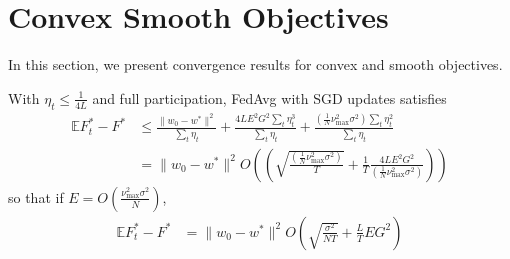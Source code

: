 


\section{Convex Smooth Objectives}

In this section, we present convergence results for convex and smooth objectives. 

\begin{theorem}
	With $\eta_{t}\leq\frac{1}{4L}$ and full participation, FedAvg with SGD updates satisfies
	\begin{align*}
	\mathbb{E}F_{t}^{\ast}-F^{\ast} & \leq\frac{\|w_{0}-w^{\ast}\|^{2}}{\sum_{t}\eta_{t}}+\frac{4LE^{2}G^{2}\sum_{t}\eta_{t}^{3}}{\sum_{t}\eta_{t}}+\frac{(\frac{1}{N}\nu_{\max}^{2}\sigma^{2})\sum_{t}\eta_{t}^{2}}{\sum_{t}\eta_{t}}\\
	& =\|w_{0}-w^{\ast}\|^{2}O((\sqrt{\frac{(\frac{1}{N}\nu_{\max}^{2}\sigma^{2})}{T}}+\frac{1}{T}\frac{4LE^{2}G^{2}}{(\frac{1}{N}\nu_{\max}^{2}\sigma^{2})}))
	\end{align*}
	so that if $E=O(\frac{\nu_{\max}^{2}\sigma^{2}}{N})$, 
	\begin{align*}
	\mathbb{E}F_{t}^{\ast}-F^{\ast} & =\|w_{0}-w^{\ast}\|^{2}O(\sqrt{\frac{\sigma^{2}}{NT}}+\frac{L}{T}EG^{2})
	\end{align*}
	\label{th:cvxsmoth}
\end{theorem}


